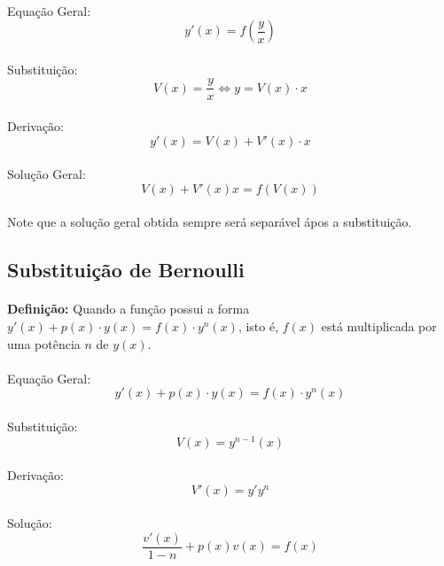 \documentclass{article}
\begin{document}
\begin{enumerate}[rightmargin = \leftmargin]
        \paragraph{}Equação Geral:
            \[y'(x)=f(\frac{y}{x})\]
        \paragraph{}Substituição:
            \[V(x)=\frac{y}{x} \Leftrightarrow y=V(x) \cdot x\]
        \paragraph{}Derivação:
            \[y'(x)=V(x)+V'(x) \cdot x\]
        \paragraph{}Solução Geral:
            \[V(x)+V'(x)x=f(V(x))\]
        \paragraph{}Note que a solução geral obtida sempre será separável ápos a substituição.
    
    \subsection{Substituição de Bernoulli}
        \paragraph{}\textbf{Definição:} Quando a função possui a forma $y'(x)+p(x) \cdot y(x)=f(x) \cdot y^{n}(x)$, isto 
        é, $f(x)$ está multiplicada por uma potência $n$ de $y(x)$.
        \paragraph{}Equação Geral:
            \[y'(x)+p(x) \cdot y(x)=f(x) \cdot y^{n}(x)\]
        \paragraph{}Substituição:
            \[V(x)=y^{n-1}(x)\]
        \paragraph{}Derivação:
            \[V'(x)=y'y^{n}\]
        \paragraph{}Solução:
            \[\frac{v'(x)}{1-n}+p(x)v(x)=f(x)\]
\newpage


\end{enumerate}
\end{document}
